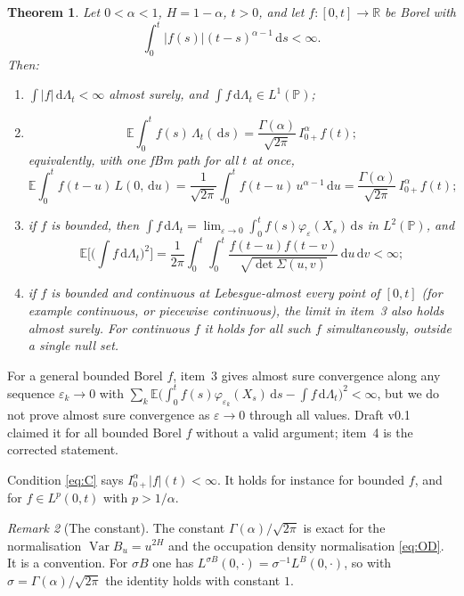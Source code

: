 \documentclass[11pt]{article}
\newtheorem{theorem}{Theorem}[section]
\theoremstyle{remark}
\newtheorem{remark}[theorem]{Remark}
\theoremstyle{definition}
\newcommand{\E}{\mathbb{E}}
\newcommand{\R}{\mathbb{R}}
\newcommand{\Prob}{\mathbb{P}}
\newcommand{\dd}{\,\mathrm{d}}
\newcommand{\Ia}{I^{\alpha}_{0+}}
\begin{document}
\begin{theorem}\label{thm:main}
Let $0<\alpha<1$, $H=1-\alpha$, $t>0$, and let $f:[0,t]\to\R$ be Borel with
\begin{equation}\label{eq:C}
\int_0^t|f(s)|(t-s)^{\alpha-1}\dd s<\infty .
\end{equation}
Then:
\begin{enumerate}
\item $\int|f|\dd\Lambda_t<\infty$ almost surely, and $\int f\dd\Lambda_t\in L^1(\Prob)$;
\item 
\begin{equation}\label{eq:main}
\E\int_0^t f(s)\,\Lambda_t(\dd s)=\frac{\Gamma(\alpha)}{\sqrt{2\pi}}\,\Ia f(t);
\end{equation}
equivalently, with one fBm path for all $t$ at once,
\[
\E\int_0^t f(t-u)\,L(0,\dd u)=\frac{1}{\sqrt{2\pi}}\int_0^t f(t-u)\,u^{\alpha-1}\dd u=\frac{\Gamma(\alpha)}{\sqrt{2\pi}}\,\Ia f(t);
\]
\item if $f$ is bounded, then $\int f\dd\Lambda_t=\lim_{\varepsilon\to0}\int_0^t f(s)\varphi_\varepsilon(X_s)\dd s$ in $L^2(\Prob)$, and
\[
\E\Big[\Big(\int f\dd\Lambda_t\Big)^2\Big]=\frac1{2\pi}\int_0^t\!\!\int_0^t\frac{f(t-u)f(t-v)}{\sqrt{\det\Sigma(u,v)}}\dd u\dd v<\infty ;
\]
\item if $f$ is bounded and continuous at Lebesgue-almost every point of $[0,t]$ (for example continuous, or piecewise continuous), the limit in item~3 also holds almost surely. For continuous $f$ it holds for all such $f$ simultaneously, outside a single null set.
\end{enumerate}
\end{theorem}

For a general bounded Borel $f$, item~3 gives almost sure convergence along any sequence $\varepsilon_k\to0$ with $\sum_k\E\big(\int_0^t f(s)\varphi_{\varepsilon_k}(X_s)\dd s-\int f\dd\Lambda_t\big)^2<\infty$, but we do not prove almost sure convergence as $\varepsilon\to0$ through all values. Draft v0.1 claimed it for all bounded Borel $f$ without a valid argument; item~4 is the corrected statement.

Condition \eqref{eq:C} says $\Ia|f|(t)<\infty$. It holds for instance for bounded $f$, and for $f\in L^p(0,t)$ with $p>1/\alpha$.

\begin{remark}[The constant]\label{rem:constant}
The constant $\Gamma(\alpha)/\sqrt{2\pi}$ is exact for the normalisation $\operatorname{Var}B_u=u^{2H}$ and the occupation density normalisation \eqref{eq:OD}. It is a convention. For $\sigma B$ one has $L^{\sigma B}(0,\cdot)=\sigma^{-1}L^{B}(0,\cdot)$, so with $\sigma=\Gamma(\alpha)/\sqrt{2\pi}$ the identity holds with constant $1$.
\end{remark}
\end{document}
